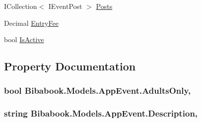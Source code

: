 \begin{DoxyCompactItemize}
\item 
I\+Collection$<$ I\+Event\+Post $>$ \hyperlink{class_bibabook_1_1_models_1_1_app_event_a59ef083c6f4f43c0f589cb248eea0b67}{Posts}
\item 
Decimal \hyperlink{class_bibabook_1_1_models_1_1_app_event_a3b3e8c61d8a4b9c57b0af87f1d12fd2d}{Entry\+Fee}
\item 
bool \hyperlink{class_bibabook_1_1_models_1_1_app_event_ae2de1c915f1142374b0d9afe4f30a596}{Is\+Active}
\end{DoxyCompactItemize}


\subsection{Property Documentation}
\hypertarget{class_bibabook_1_1_models_1_1_app_event_a3790cdd6ba4f1cb6af661aa209741304}{}
\subsubsection[{Adults\+Only}]{\setlength{\rightskip}{0pt plus 5cm}bool Bibabook.\+Models.\+App\+Event.\+Adults\+Only\hspace{0.3cm}{\ttfamily [get]}, {\ttfamily [set]}}\label{class_bibabook_1_1_models_1_1_app_event_a3790cdd6ba4f1cb6af661aa209741304}
\hypertarget{class_bibabook_1_1_models_1_1_app_event_a708f5e987188de2194b658e65f0eccf8}{}
\subsubsection[{Description}]{\setlength{\rightskip}{0pt plus 5cm}string Bibabook.\+Models.\+App\+Event.\+Description\hspace{0.3cm}{\ttfamily [get]}, {\ttfamily [set]}}\label{class_bibabook_1_1_models_1_1_app_event_a708f5e987188de2194b658e65f0eccf8}
\hypertarget{class_bibabook_1_1_models_1_1_app_event_a3b3e8c61d8a4b9c57b0af87f1d12fd2d}{}
